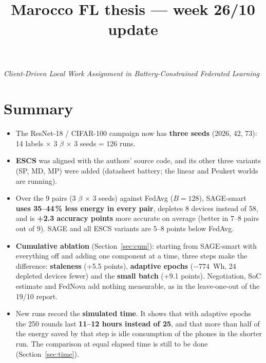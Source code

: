 \documentclass[11pt,a4paper]{article}
\title{\bfseries Marocco FL thesis --- week 26/10 update}
\author{}
\date{}
\begin{document}
\maketitle
\vspace{-3.2em}
\begin{center}
\emph{Client-Driven Local Work Assignment in Battery-Constrained Federated Learning}
\end{center}
\vspace{1em}

\section*{Summary}

\begin{itemize}
  \item The ResNet-18 / CIFAR-100 campaign now has \textbf{three seeds}
        (2026, 42, 73): 14 labels $\times$ 3 $\beta$ $\times$ 3 seeds = 126 runs.
  \item \textbf{ESCS} was aligned with the authors' source code, and its other
        three variants (SP, MD, MP) were added (datasheet battery; the linear and
        Peukert worlds are running).
  \item Over the 9 pairs (3 $\beta$ $\times$ 3 seeds) against FedAvg ($B=128$),
        SAGE-smart \textbf{uses 35--44\,\% less energy in every pair}, depletes
        8 devices instead of 58, and is \textbf{+2.3 accuracy points} more
        accurate on average (better in 7--8 pairs out of 9). SAGE and all ESCS
        variants are 5--8 points below FedAvg.
  \item \textbf{Cumulative ablation} (Section~\ref{sec:cum}): starting from
        SAGE-smart with everything off and adding one component at a time, three
        steps make the difference: \textbf{staleness} (+5.5 points),
        \textbf{adaptive epochs} ($-774$~Wh, 24 depleted devices fewer) and the
        \textbf{small batch} (+9.1 points). Negotiation, SoC estimate and FedNova
        add nothing measurable, as in the leave-one-out of the 19/10 report.
  \item New runs record the \textbf{simulated time}. It shows that with adaptive
        epochs the 250 rounds last \textbf{11--12 hours instead of 25}, and that
        more than half of the energy saved by that step is idle consumption of the
        phones in the shorter run. The comparison at equal elapsed time is still
        to be done (Section~\ref{sec:time}).
\end{itemize}
\end{document}
